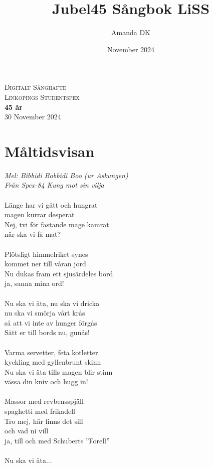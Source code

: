 \documentclass[a5paper,15pt]{article}
\title{Jubel45 Sångbok LiSS}
\author{Amanda DK}
\date{November 2024}
\begin{document}
\vbox{ }

\vbox{ }

\begin{center}
\textsc{\LARGE Digitalt Sånghäfte}\\[1.5cm]
\textsc{\Large Linköpings Studentspex}\\[0.5cm]

\vbox{ }
{ \huge \bfseries 45 år}\\[0.4cm]




{\large 30 November 2024}

\end{center}


\tableofcontents

\setcounter{section}{0}
\renewcommand{\thesection}{S \arabic{section}}

\section{Måltidsvisan}
\emph{Mel: Bibbidi Bobbidi Boo (ur Askungen) \\
Från Spex-84 Kung mot sin vilja}\\
\\
Länge har vi gått och hungrat\\
magen kurrar desperat\\
Nej, tvi för fastande mage kamrat\\
när ska vi få mat?\\
\\
Plötsligt himmelriket synes\\
kommet ner till våran jord\\
Nu dukas fram ett sjusärdeles bord\\
ja, sanna mina ord!\\
\\
Nu ska vi äta, nu ska vi dricka\\
nu ska vi smörja vårt krås\\
så att vi inte av hunger förgås\\
Sätt er till bords nu, gunås!\\
\\
Varma servetter, feta kotletter\\
kyckling med gyllenbrunt skinn\\
Nu ska vi äta tills magen blir stinn\\
vässa din kniv och hugg in!\\
\\
Massor med revbensspjäll\\
spaghetti med frikadell\\
Tro mej, här finns det sill\\
och vad ni vill\\
ja, till och med Schuberts ''Forell''\\
\\
Nu ska vi äta...
\end{document}
